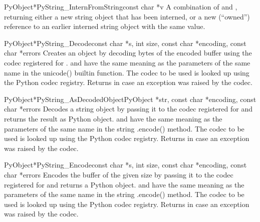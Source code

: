 \documentclass{manual}
\begin{document}
\begin{cfuncdesc}{PyObject*}{PyString_InternFromString}{const char *v}
A combination of  and
, returning either a new string object
that has been interned, or a new (``owned'') reference to an earlier
interned string object with the same value.
\end{cfuncdesc}

\begin{cfuncdesc}{PyObject*}{PyString_Decode}{const char *s,
                                               int size,
                                               const char *encoding,
                                               const char *errors}
Creates an object by decoding  bytes of the encoded
buffer  using the codec registered
for .  and  have the same meaning
as the parameters of the same name in the unicode() builtin
function. The codec to be used is looked up using the Python codec
registry. Returns \NULL{} in case an exception was raised by the
codec.
\end{cfuncdesc}

\begin{cfuncdesc}{PyObject*}{PyString_AsDecodedObject}{PyObject *str,
                                               const char *encoding,
                                               const char *errors}
Decodes a string object by passing it to the codec registered
for  and returns the result as Python 
object.  and  have the same meaning as the
parameters of the same name in the string .encode() method. The codec
to be used is looked up using the Python codec registry. Returns
\NULL{} in case an exception was raised by the codec.
\end{cfuncdesc}

\begin{cfuncdesc}{PyObject*}{PyString_Encode}{const char *s,
                                               int size,
                                               const char *encoding,
                                               const char *errors}
Encodes the  buffer of the given size by passing it to 
the codec registered for  and returns a Python object. 
 and  have the same
meaning as the parameters of the same name in the string .encode()
method. The codec to be used is looked up using the Python codec
registry. Returns \NULL{} in case an exception was raised by the
codec.
\end{cfuncdesc}
\end{document}
